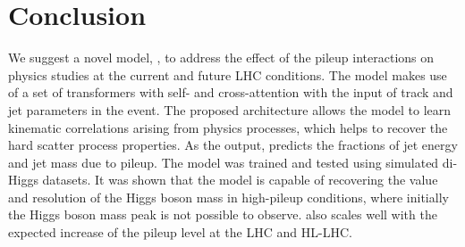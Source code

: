 \section{Conclusion}\hfill

We suggest a novel model, \myname{}, to address the effect of the pileup interactions on physics studies at the current and future LHC conditions. The model makes use of a set of transformers with self- and cross-attention with the input of track and jet parameters in the event. The proposed architecture allows the model to learn kinematic correlations arising from physics processes, which helps to recover the hard scatter process properties. As the output, \myname{} predicts the fractions of jet energy and jet mass due to pileup. The model was trained and tested using simulated di-Higgs datasets. It was shown that the model is capable of recovering the value and resolution of the Higgs boson mass in high-pileup conditions, where initially the Higgs boson mass peak is not possible to observe. \myname{} also scales well with the expected increase of the pileup level at the LHC and HL-LHC.


